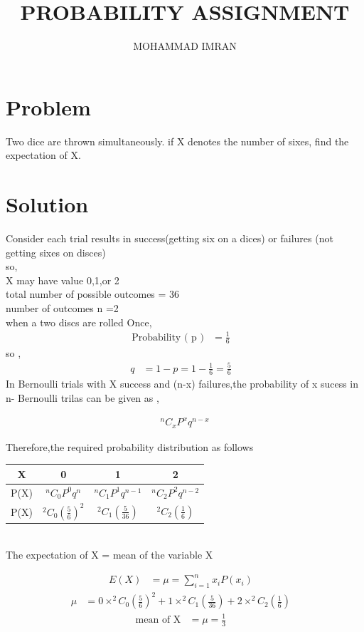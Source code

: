 \documentclass[journal,12pt,two column]{article}
\title{PROBABILITY ASSIGNMENT}
\author{MOHAMMAD IMRAN}
\begin{document}
\maketitle
\bigskip


 \section{Problem }
  Two dice are thrown simultaneously. if X denotes the number of sixes, find the
expectation of X.

\section{Solution }
Consider each trial results in success(getting six on a dices) or failures (not getting sixes on disces)\\
so,\\
X may have value 0,1,or 2\\
total number of possible outcomes = 36\\
number of outcomes n =2\\
when a  two discs are rolled Once,\\

\begin{align}
\text{Probability ( p )} &=
\frac{1}{6}&
 \end{align}
 so ,
 \begin{align}
  q &= 1-p = 1-\frac{1}{6} = \frac{5}{6}&
 \end{align}
 In Bernoulli trials with X success and (n-x) failures,the probability of x sucess in n- Bernoulli trilas can be given as ,
 
\begin{align}
 &^nC_xP^xq^{n-x}&
\end{align}

Therefore,the required probability distribution as follows\\

 \begin{tabular}{ |c |c |c |c |}
 \hline
 X  &  0  &  1  &  2\\
 \hline
 
 P(X)  &  $^nC_0P^0q^n$  &  $^nC_1P^1q^{n-1}$  &  $^nC_2P^2q^{n-2}$\\
 \hline
 
 P(X)  &   $^2C_0(\frac{5}{6})^2$ &  $^2C_1(\frac{5}{36})$ &   $^2C_2(\frac{1}{6})$ \\
 \hline
 
 \end{tabular}\\
 
 
 The expectation of X = mean of the variable X 
 
 \begin{align}
  E(X)&=\mu=\sum_{i=1}^{n} x_i P(x_i)&
\end{align}
\begin{align}
\mu&=0\times^2C_0(\frac{5}{6})^2+1\times^2C_1(\frac{5}{36})+2\times^2C_2(\frac{1}{6})&
\end{align}
\begin{align}
 \text{mean of X}&=\mu=\frac{1}{3}&
 \end{align}
 
 
\end{document}
